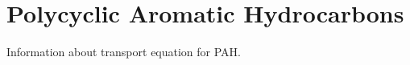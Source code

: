 \section{Polycyclic Aromatic Hydrocarbons}
\label{sec:lesmodels:pah}

Information about transport equation for PAH.
